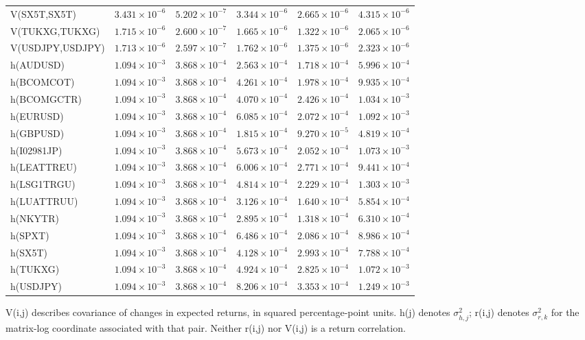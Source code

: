 \documentclass[10pt,a4paper]{article}
\begin{document}
\begin{tabular*}{\linewidth}{@{\extracolsep{\fill}}lrrrrr@{}}
V(SX5T,SX5T) & $3.431\times10^{-6}$ & $5.202\times10^{-7}$ & $3.344\times10^{-6}$ & $2.665\times10^{-6}$ & $4.315\times10^{-6}$ \\
V(TUKXG,TUKXG) & $1.715\times10^{-6}$ & $2.600\times10^{-7}$ & $1.665\times10^{-6}$ & $1.322\times10^{-6}$ & $2.065\times10^{-6}$ \\
V(USDJPY,USDJPY) & $1.713\times10^{-6}$ & $2.597\times10^{-7}$ & $1.762\times10^{-6}$ & $1.375\times10^{-6}$ & $2.323\times10^{-6}$ \\
h(AUDUSD) & $1.094\times10^{-3}$ & $3.868\times10^{-4}$ & $2.563\times10^{-4}$ & $1.718\times10^{-4}$ & $5.996\times10^{-4}$ \\
h(BCOMCOT) & $1.094\times10^{-3}$ & $3.868\times10^{-4}$ & $4.261\times10^{-4}$ & $1.978\times10^{-4}$ & $9.935\times10^{-4}$ \\
h(BCOMGCTR) & $1.094\times10^{-3}$ & $3.868\times10^{-4}$ & $4.070\times10^{-4}$ & $2.426\times10^{-4}$ & $1.034\times10^{-3}$ \\
h(EURUSD) & $1.094\times10^{-3}$ & $3.868\times10^{-4}$ & $6.085\times10^{-4}$ & $2.072\times10^{-4}$ & $1.092\times10^{-3}$ \\
h(GBPUSD) & $1.094\times10^{-3}$ & $3.868\times10^{-4}$ & $1.815\times10^{-4}$ & $9.270\times10^{-5}$ & $4.819\times10^{-4}$ \\
h(I02981JP) & $1.094\times10^{-3}$ & $3.868\times10^{-4}$ & $5.673\times10^{-4}$ & $2.052\times10^{-4}$ & $1.073\times10^{-3}$ \\
h(LEATTREU) & $1.094\times10^{-3}$ & $3.868\times10^{-4}$ & $6.006\times10^{-4}$ & $2.771\times10^{-4}$ & $9.441\times10^{-4}$ \\
h(LSG1TRGU) & $1.094\times10^{-3}$ & $3.868\times10^{-4}$ & $4.814\times10^{-4}$ & $2.229\times10^{-4}$ & $1.303\times10^{-3}$ \\
h(LUATTRUU) & $1.094\times10^{-3}$ & $3.868\times10^{-4}$ & $3.126\times10^{-4}$ & $1.640\times10^{-4}$ & $5.854\times10^{-4}$ \\
h(NKYTR) & $1.094\times10^{-3}$ & $3.868\times10^{-4}$ & $2.895\times10^{-4}$ & $1.318\times10^{-4}$ & $6.310\times10^{-4}$ \\
h(SPXT) & $1.094\times10^{-3}$ & $3.868\times10^{-4}$ & $6.486\times10^{-4}$ & $2.086\times10^{-4}$ & $8.986\times10^{-4}$ \\
h(SX5T) & $1.094\times10^{-3}$ & $3.868\times10^{-4}$ & $4.128\times10^{-4}$ & $2.993\times10^{-4}$ & $7.788\times10^{-4}$ \\
h(TUKXG) & $1.094\times10^{-3}$ & $3.868\times10^{-4}$ & $4.924\times10^{-4}$ & $2.825\times10^{-4}$ & $1.072\times10^{-3}$ \\
h(USDJPY) & $1.094\times10^{-3}$ & $3.868\times10^{-4}$ & $8.206\times10^{-4}$ & $3.353\times10^{-4}$ & $1.249\times10^{-3}$ \\
\bottomrule
\end{tabular*}\endgroup
\par\medskip\footnotesize
V(i,j) describes covariance of changes in expected returns, in squared percentage-point units.
h(j) denotes $\sigma_{h,j}^{2}$; r(i,j) denotes $\sigma_{r,k}^{2}$ for the matrix-log coordinate
associated with that pair. Neither r(i,j) nor V(i,j) is a return correlation.
\end{document}
